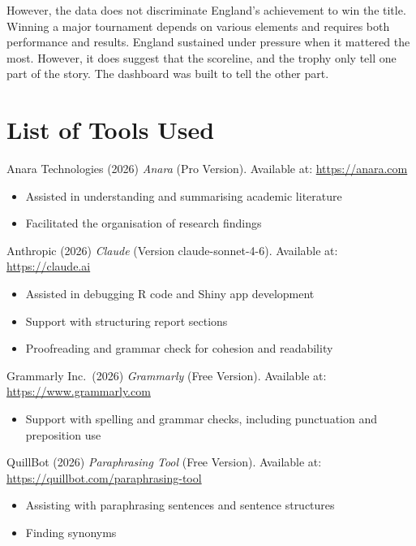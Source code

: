 \documentclass[
  11pt,
  a4paper,
  DIV=11,
  numbers=noendperiod]{scrartcl}
\providecommand{\tightlist}{%
  \setlength{\itemsep}{0pt}\setlength{\parskip}{0pt}}
\begin{document}
However, the data does not discriminate England's achievement to win the
title. Winning a major tournament depends on various elements and
requires both performance and results. England sustained under pressure
when it mattered the most. However, it does suggest that the scoreline,
and the trophy only tell one part of the story. The dashboard was built
to tell the other part.

\newpage{}

\section*{List of Tools Used}\label{list-of-tools-used}

Anara Technologies (2026) \emph{Anara} (Pro Version). Available at:
\url{https://anara.com}

\begin{itemize}
\tightlist
\item
  Assisted in understanding and summarising academic literature
\item
  Facilitated the organisation of research findings
\end{itemize}

Anthropic (2026) \emph{Claude} (Version claude-sonnet-4-6). Available
at: \url{https://claude.ai}

\begin{itemize}
\tightlist
\item
  Assisted in debugging R code and Shiny app development
\item
  Support with structuring report sections
\item
  Proofreading and grammar check for cohesion and readability
\end{itemize}

Grammarly Inc.~(2026) \emph{Grammarly} (Free Version). Available at:
\url{https://www.grammarly.com}

\begin{itemize}
\tightlist
\item
  Support with spelling and grammar checks, including punctuation and
  preposition use
\end{itemize}

QuillBot (2026) \emph{Paraphrasing Tool} (Free Version). Available at:
\url{https://quillbot.com/paraphrasing-tool}

\begin{itemize}
\tightlist
\item
  Assisting with paraphrasing sentences and sentence structures
\item
  Finding synonyms
\end{itemize}
\end{document}
